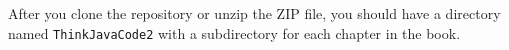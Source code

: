 After you clone the repository or unzip the ZIP file, you should have a directory named {\tt ThinkJavaCode2} with a subdirectory for each chapter in the book.
